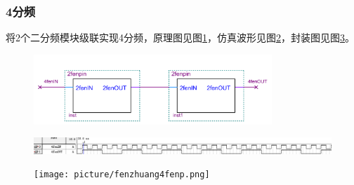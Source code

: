 \documentclass[12pt]{article}
\begin{document}
\subsubsection{4分频}
将2个二分频模块级联实现4分频，原理图见图\ref{fig:4fenpin}，仿真波形见图\ref{fig:fangzhen4fenpin}，封装图见图\ref{fig:fengzhuang4fenpin}。
\begin{figure}[hp]
	\centering  
	\includegraphics[width=0.8\textwidth]{picture/4fenpin.png} 
	\caption{}
	\label{fig:4fenpin}   
\end{figure}
\begin{figure}[hp]
	\centering  
	\includegraphics[width=\textwidth]{picture/TIM20181210161238.png} 
	\caption{}
	\label{fig:fangzhen4fenpin}   
\end{figure}
\begin{figure}[hp]
	\centering  
	\texttt{[image: picture/fenzhuang4fenp.png]} 
	\caption{}
	\label{fig:fengzhuang4fenpin}   
\end{figure}
\end{document}
